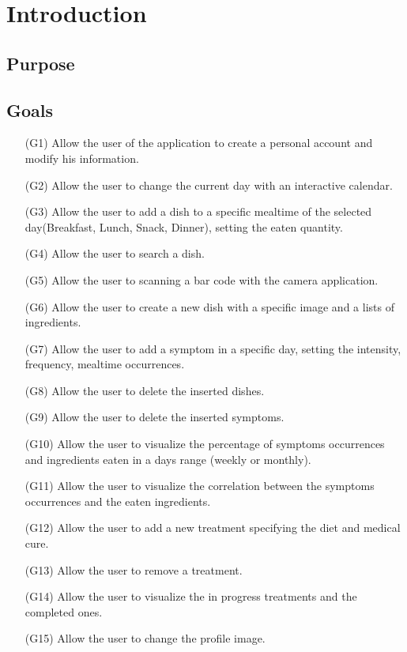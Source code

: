 \documentclass [12pt]{article}
\begin{document}
\clearpage

\tableofcontents

\section{Introduction}
\subsection{Purpose}
\subsection{Goals}
\begin{enumerate}
\item[(G1)]Allow the user of the application to create a personal account and modify his information.
\item[(G2)]Allow the user to change the current day with an interactive calendar.
\item[(G3)]Allow the user to add a dish to a specific mealtime of the selected day(Breakfast, Lunch, Snack, Dinner), setting the eaten quantity.
\item[(G4)]Allow the user to search a dish.
\item[(G5)]Allow the user to scanning a bar code with the camera application.
\item[(G6)]Allow the user to create a new dish with a specific image and a lists of ingredients. 
\item[(G7)]Allow the user to add a symptom in a specific day, setting the intensity, frequency, mealtime occurrences.
\item[(G8)]Allow the user to delete the inserted dishes.
\item[(G9)]Allow the user to delete the inserted symptoms.
\item[(G10)]Allow the user to visualize the percentage of symptoms occurrences and ingredients eaten in a days range (weekly or monthly).
\item[(G11)]Allow the user to visualize the correlation between the symptoms occurrences and the eaten ingredients.
\item[(G12)]Allow the user to add a new treatment specifying the diet and medical cure.
\item[(G13)]Allow the user to remove a treatment.
\item[(G14)]Allow the user to visualize the in progress treatments and the completed ones.
\item[(G15)]Allow the user to change the profile image.


\end{enumerate}
\end{document}
